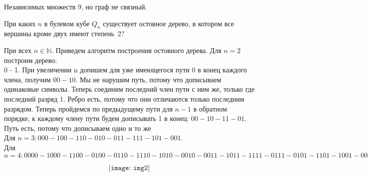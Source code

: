 \documentclass[11pt]{article}
\begin{document}
	Независимых множеств 9, но граф не связный.
	
	\p При каких $n$ в булевом кубе $Q_n$ существует остовное дерево, в котором все вершины кроме двух имеют степень~2?
	
	При всех $n \in \mathbb{N}$. Приведем алгоритм построения остовного дерева. Для $n = 2$ построим дерево: \\ 0 - 1. При увеличении n допишем для уже имеющегося пути 0 в конец каждого члена, получим $00 - 10$. Мы не нарушим путь, потому что дописываем одинаковые символы. Теперь соединим последний член пути с ним же, только где последний разряд 1. Ребро есть, потому что они отличаются только последним разрядом. Теперь пройдемся по предыдущему пути для $n - 1$ в обратном порядке, к каждому члену пути будем дописывать 1 в конец: $00 - 10 - 11 - 01$. Путь есть, потому что дописываем одно и то же \\
	Для $n = 3: 000 - 100 - 110 - 010 - 011 - 111 - 101 - 001$.  \\
	Для $n = 4: 0000 - 1000 - 1100 - 0100 - 0110 - 1110 - 1010 - 0010 - 0011 - 1011 - 1111 - 0111 - 0101 - 1101 - 1001 - 0001$
	
	\[\texttt{[image: img2]}\]
	
\end{document}
